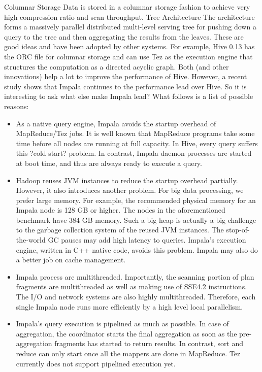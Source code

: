 \documentclass[11pt]{book}
\begin{document}
Columnar Storage
Data is stored in a columnar storage fashion to achieve very high compression ratio and scan throughput.
Tree Architecture
The architecture forms a massively parallel distributed multi-level serving tree for pushing down a query to the tree and then aggregating the results from the leaves.
These are good ideas and have been adopted by other systems. For example, Hive 0.13 has the ORC file for columnar storage and can use Tez as the execution engine that structures the computation as a directed acyclic graph. Both (and other innovations) help a lot to improve the performance of Hive. However, a recent study shows that Impala continues to the performance lead over Hive. So it is interesting to ask what else make Impala lead? What follows is a list of possible reasons:
\begin{itemize}
\item As a native query engine, Impala avoids the startup overhead of MapReduce/Tez jobs. It is well known that MapReduce programs take some time before all nodes are running at full capacity. In Hive, every query suffers this ?cold start? problem. In contrast, Impala daemon processes are started at boot time, and thus are always ready to execute a query.
\item Hadoop reuses JVM instances to reduce the startup overhead partially. However, it also introduces another problem. For big data processing, we prefer large memory. For example, the recommended physical memory for an Impala node is 128 GB or higher. The nodes in the aforementioned benchmark have 384 GB memory. Such a big heap is actually a big challenge to the garbage collection system of the reused JVM instances. The stop-of-the-world GC pauses may add high latency to queries. Impala's execution engine, written in C++ native code, avoids this problem. Impala may also do a better job on cache management.
\item Impala process are multithreaded. Importantly, the scanning portion of plan fragments are multithreaded as well as making use of SSE4.2 instructions. The I/O and network systems are also highly multithreaded. Therefore, each single Impala node runs more efficiently by a high level local parallelism. 
\item Impala's query execution is pipelined as much as possible. In case of aggregation, the coordinator starts the final aggregation as soon as the pre-aggregation fragments has started to return results. In contrast, sort and reduce can only start once all the mappers are done in MapReduce. Tez currently does not support pipelined execution yet.

\end{itemize}
\end{document}
